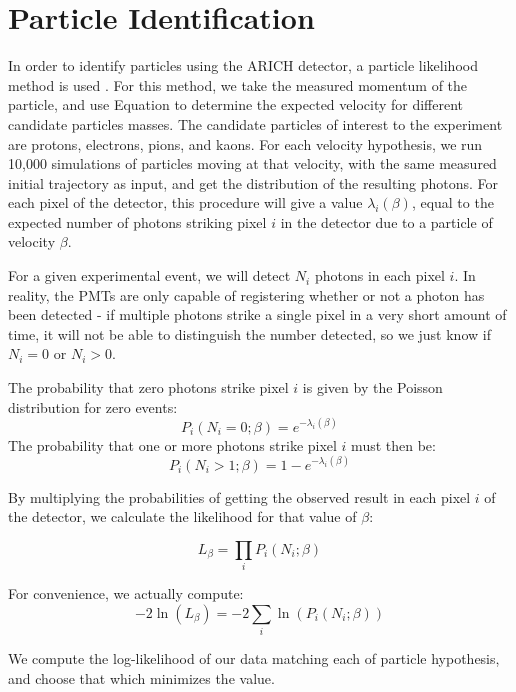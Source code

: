 \section{Particle Identification}
\label{sec:particleIdentification}
In order to identify particles using the \ac{ARICH} detector, a particle likelihood method is used \cite{richImpact, belleArich}.
For this method, we take the measured momentum of the particle, and use Equation  to determine the expected velocity for different candidate particles masses.
The candidate particles of interest to the experiment are protons, electrons, pions, and kaons.
For each velocity hypothesis, we run 10,000 simulations of particles moving at that velocity, with the same measured initial trajectory as input, and get the distribution of the resulting photons.
For each pixel of the detector, this procedure will give a value $\lambda_i(\beta)$, equal to the expected number of photons striking pixel $i$ in the detector due to a particle of velocity $\beta$. 

For a given experimental event, we will detect $N_i$ photons in each pixel $i$.
In reality, the PMTs are only capable of registering whether or not a photon has been detected - if multiple photons strike a single pixel in a very short amount of time, it will not be able to distinguish the number detected, so we just know if $N_i = 0$ or $N_i > 0$.

The probability that zero photons strike pixel $i$ is given by the Poisson distribution for zero events:
$$ P_i(N_i=0; \beta) = e^{-\lambda_i(\beta)} $$
 The probability that one or more photons strike pixel $i$ must then be:
$$ P_i(N_i>1; \beta) = 1 - e^{-\lambda_i(\beta)} $$

By multiplying the probabilities of getting the observed result in each pixel $i$ of the detector, we calculate the likelihood for that value of $\beta$:

$$L_\beta = \prod_{i}P_i(N_i; \beta)$$

For convenience, we actually compute:
\begin{equation}
    \label{eq:loglikelihood}
    -2\ln(L_\beta) = -2\sum_i \ln(P_i(N_i; \beta))
\end{equation}

We compute the log-likelihood of our data matching each of particle hypothesis, and choose that which minimizes the value.


